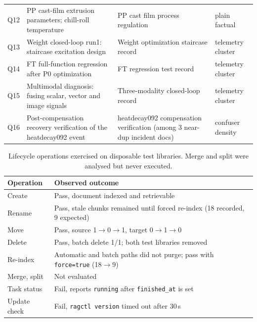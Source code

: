 \begin{table}[t]
\begin{tabular}{lp{5.3cm}p{4.0cm}p{2.8cm}}
Q12 & PP cast-film extrusion parameters; chill-roll temperature & PP cast
film process regulation & plain factual \\
Q13 & Weight closed-loop run1: staircase excitation design & Weight
optimization staircase record & telemetry cluster \\
Q14 & FT full-function regression after P0 optimization & FT regression test
record & telemetry cluster \\
Q15 & Multimodal diagnosis: fusing scalar, vector and image signals &
Three-modality closed-loop record & telemetry cluster \\
Q16 & Post-compensation recovery verification of the heatdecay092 event &
heatdecay092 compensation verification (among 3 near-dup incident docs) &
confuser density \\
\bottomrule
\end{tabular}
\end{table}

\begin{table}[t]
\centering
\small
\setlength{\tabcolsep}{4pt}
\caption{Lifecycle operations exercised on disposable test libraries.
Merge and split were analysed but never executed.}
\label{tab:org-ops}
\begin{tabular}{@{}l>{\raggedright\arraybackslash}p{11.2cm}@{}}
\toprule
Operation & Observed outcome \\
\midrule
Create & Pass, document indexed and retrievable \\
Rename & Pass, stale chunks remained until forced re-index (18 recorded, 9 expected) \\
Move & Pass, source 1$\rightarrow$0$\rightarrow$1, target 0$\rightarrow$1$\rightarrow$0 \\
Delete & Pass, batch delete 1/1; both test libraries removed \\
Re-index & Automatic and batch paths did not purge; pass with \texttt{force=true} (18$\rightarrow$9) \\
Merge, split & Not evaluated \\
Task status & Fail, reports \texttt{running} after \texttt{finished\_at} is set \\
Update check & Fail, \texttt{ragctl version} timed out after 30\,s \\
\bottomrule
\end{tabular}
\end{table}
